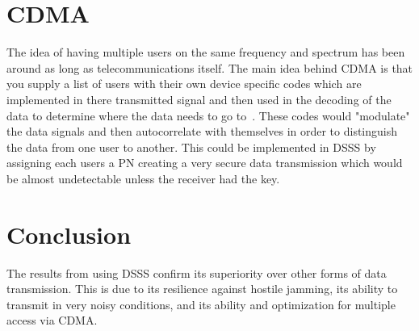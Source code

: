 \documentclass[journal]{IEEEtran}
\begin{document}
\section{CDMA}
The idea of having multiple users on the same frequency and spectrum has been around as long as telecommunications itself. The main idea behind CDMA is that you supply a list of users with their own device specific codes which are implemented in there transmitted signal and then used in the decoding of the data to determine where the data needs to go to~\cite{ECPS}. These codes would "modulate" the data signals and then autocorrelate with themselves in order to distinguish the data from one user to another. This could be implemented in DSSS by assigning each users a PN creating a very secure data transmission which would be almost undetectable unless the receiver had the key.

\section{Conclusion}
The results from using DSSS confirm its superiority over other forms of data transmission. This is due to its resilience against hostile jamming, its ability to transmit in very noisy conditions, and its ability and optimization for multiple access via CDMA.  

\end{document}
